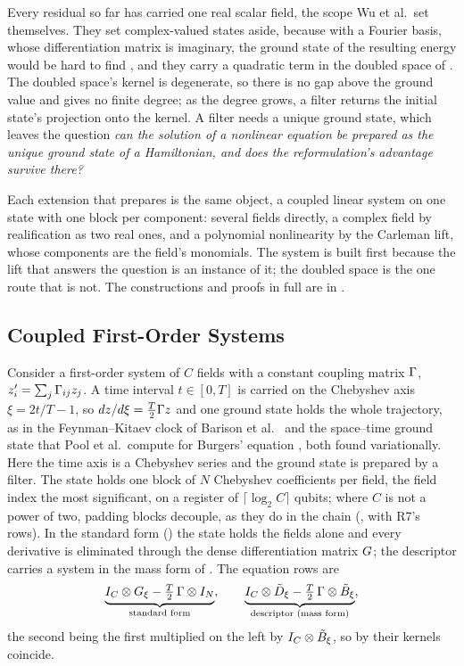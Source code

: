 Every residual so far has carried one real scalar field, the scope Wu et al.\ set themselves. They set complex-valued states aside, because with a Fourier basis, whose differentiation matrix is imaginary, the ground state of the resulting energy would be hard to find \cite{wu2025pihm}, and they carry a quadratic term in the doubled space of . The doubled space's kernel is degenerate, so there is no gap above the ground value and  gives no finite degree; as the degree grows, a filter returns the initial state's projection onto the kernel. A filter needs a unique ground state, which leaves the question \emph{can the solution of a nonlinear equation be prepared as the unique ground state of a Hamiltonian, and does the reformulation's advantage survive there?}

Each extension that prepares is the same object, a coupled linear system on one state with one block per component: several fields directly, a complex field by realification as two real ones, and a polynomial nonlinearity by the Carleman lift, whose components are the field's monomials. The system is built first because the lift that answers the question is an instance of it; the doubled space is the one route that is not. The constructions and proofs in full are in .

\subsection{Coupled First-Order Systems}
\label{sec:systems-fields}

Consider a first-order system of $C$ fields with a constant coupling matrix $\Gamma$, $z_i'=\sum_j\Gamma_{ij}z_j$. A time interval $t\in[0,T]$ is carried on the Chebyshev axis $\xi=2t/T-1$, so $dz/d\xi=\tfrac T2\Gamma z$ and one ground state holds the whole trajectory, as in the Feynman--Kitaev clock of Barison et al.\ \cite{barison2022variational} and the space--time ground state that Pool et al.\ compute for Burgers' equation \cite{pool2024nonlinear}, both found variationally. Here the time axis is a Chebyshev series and the ground state is prepared by a filter. The state holds one block of $N$ Chebyshev coefficients per field, the field index the most significant, on a register of $\lceil\log_2C\rceil$ qubits; where $C$ is not a power of two, padding blocks decouple, as they do in the chain (, with R7's rows). In the standard form () the state holds the fields alone and every derivative is eliminated through the dense differentiation matrix $G$; the descriptor carries a system in the mass form of . The equation rows are
\begin{equation}
    \underbrace{I_C\otimes G_\xi-\tfrac T2\,\Gamma\otimes I_N}_{\text{standard form}},
    \qquad
    \underbrace{I_C\otimes\tilde{D}_\xi-\tfrac T2\,\Gamma\otimes\tilde{B}_\xi}_{\text{descriptor (mass form)}},
    \label{eq:system-rows}
\end{equation}
the second being the first multiplied on the left by $I_C\otimes\tilde{B}_\xi$, so by  their kernels coincide.

